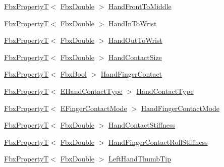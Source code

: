 \begin{DoxyCompactItemize}
\item 
\hyperlink{class_fbx_property_t}{Fbx\+PropertyT}$<$ \hyperlink{fbxtypes_8h_a171e72a1c46fc15c1a6c9c31948c1c5b}{Fbx\+Double} $>$ \hyperlink{class_fbx_character_a8b85a6d7fca56d23eb56d5ad92c63385}{Hand\+Front\+To\+Middle}
\item 
\hyperlink{class_fbx_property_t}{Fbx\+PropertyT}$<$ \hyperlink{fbxtypes_8h_a171e72a1c46fc15c1a6c9c31948c1c5b}{Fbx\+Double} $>$ \hyperlink{class_fbx_character_a1c2c2abe75a505a4dbaa7a303d44d0a5}{Hand\+In\+To\+Wrist}
\item 
\hyperlink{class_fbx_property_t}{Fbx\+PropertyT}$<$ \hyperlink{fbxtypes_8h_a171e72a1c46fc15c1a6c9c31948c1c5b}{Fbx\+Double} $>$ \hyperlink{class_fbx_character_a8d6319089637fd340baeead343320f79}{Hand\+Out\+To\+Wrist}
\item 
\hyperlink{class_fbx_property_t}{Fbx\+PropertyT}$<$ \hyperlink{fbxtypes_8h_a171e72a1c46fc15c1a6c9c31948c1c5b}{Fbx\+Double} $>$ \hyperlink{class_fbx_character_ae54641c1886b9a7fdd7761804a868454}{Hand\+Contact\+Size}
\item 
\hyperlink{class_fbx_property_t}{Fbx\+PropertyT}$<$ \hyperlink{fbxtypes_8h_a92e0562b2fe33e76a242f498b362262e}{Fbx\+Bool} $>$ \hyperlink{class_fbx_character_aba418b90928e70e76a2d5892e134c702}{Hand\+Finger\+Contact}
\item 
\hyperlink{class_fbx_property_t}{Fbx\+PropertyT}$<$ \hyperlink{class_fbx_character_a37c46ee42910cc3209e925bc4c7361f4}{E\+Hand\+Contact\+Type} $>$ \hyperlink{class_fbx_character_af0af2decb9d4fcc0cfbe59c077719343}{Hand\+Contact\+Type}
\item 
\hyperlink{class_fbx_property_t}{Fbx\+PropertyT}$<$ \hyperlink{class_fbx_character_a97bd5ed3c7b4a63bf46ef111e7dc0f0a}{E\+Finger\+Contact\+Mode} $>$ \hyperlink{class_fbx_character_a83c7da8980616b8a44c635c70878c182}{Hand\+Finger\+Contact\+Mode}
\item 
\hyperlink{class_fbx_property_t}{Fbx\+PropertyT}$<$ \hyperlink{fbxtypes_8h_a171e72a1c46fc15c1a6c9c31948c1c5b}{Fbx\+Double} $>$ \hyperlink{class_fbx_character_a0673e6c72f7ba48be94bf9cac8421fab}{Hand\+Contact\+Stiffness}
\item 
\hyperlink{class_fbx_property_t}{Fbx\+PropertyT}$<$ \hyperlink{fbxtypes_8h_a171e72a1c46fc15c1a6c9c31948c1c5b}{Fbx\+Double} $>$ \hyperlink{class_fbx_character_ad7d6f16d141ad3e5adbb5670e55299c1}{Hand\+Finger\+Contact\+Roll\+Stiffness}
\item 
\hyperlink{class_fbx_property_t}{Fbx\+PropertyT}$<$ \hyperlink{fbxtypes_8h_a171e72a1c46fc15c1a6c9c31948c1c5b}{Fbx\+Double} $>$ \hyperlink{class_fbx_character_a0a7faf388b19788293329e3a58df0117}{Left\+Hand\+Thumb\+Tip}

\end{DoxyCompactItemize}
